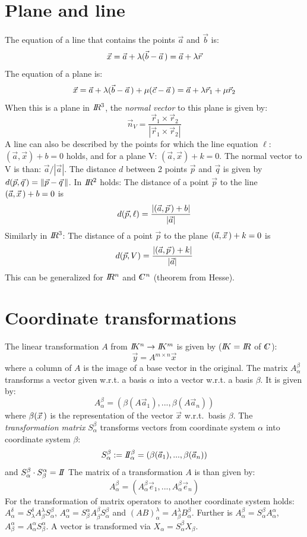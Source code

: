 \documentclass[twoside]{report}
\begin{document}
\section{Plane and line}
The equation of a line that contains the points $\vec{a}$ and $\vec{b}$ is:
\[
\vec{x}=\vec{a}+\lambda(\vec{b}-\vec{a}\,)=\vec{a}+\lambda\vec{r}
\]
The equation of a plane is:
\[
\vec{x}=\vec{a}+\lambda(\vec{b}-\vec{a}\,)+\mu(\vec{c}-\vec{a}\,)=\vec{a}+\lambda\vec{r}_1+\mu\vec{r}_2
\]
When this is a plane in $I\hspace{-1mm}R^3$, the {\it normal vector} to this plane is given
by:
\[
\vec{n}_V=\frac{\vec{r}_1\times\vec{r}_2}{|\vec{r}_1\times\vec{r}_2|}
\]
A line can also be described by the points for which the line equation
$\ell$: $(\vec{a},\vec{x})+b=0$ holds, and for a plane V: $(\vec{a},\vec{x})+k=0$.
The normal vector to V is than: $\vec{a}/|\vec{a}|$.
\npar
The distance $d$ between 2 points $\vec{p}$ and $\vec{q}$ is given by
$d(\vec{p},\vec{q}\,)=\|\vec{p}-\vec{q}\,\|$.
\npar
In $I\hspace{-1mm}R^2$ holds:
The distance of a point $\vec{p}$ to the line $(\vec{a},\vec{x}\,)+b=0$ is
\[
d(\vec{p},\ell)=\frac{|(\vec{a},\vec{p}\,)+b|}{|\vec{a}|}
\]
Similarly in $I\hspace{-1mm}R^3$:
The distance of a point $\vec{p}$ to the plane $(\vec{a},\vec{x}\,)+k=0$ is
\[
d(\vec{p},V)=\frac{|(\vec{a},\vec{p}\,)+k|}{|\vec{a}|}
\]
This can be generalized for $I\hspace{-1mm}R^n$ and $\CC^n$ (theorem from Hesse).

\section{Coordinate transformations}
The linear transformation $A$ from $I\hspace{-1mm}K^n\rightarrow I\hspace{-1mm}K^m$ is given by
($I\hspace{-1mm}K=I\hspace{-1mm}R$ of $\CC$):
\[
\vec{y}=A^{m\times n}\vec{x}
\]
where a column of $A$ is the image of a base vector in the original.
\npar
The matrix $A_\alpha^\beta$ transforms a vector given w.r.t. a basis
$\alpha$ into a vector w.r.t. a basis $\beta$. It is given by:
\[
A_\alpha^\beta=\left(\beta(A\vec{a}_1),...,\beta(A\vec{a}_n)\right)
\]
where $\beta(\vec{x}\,)$ is the representation of the vector $\vec{x}$
w.r.t.\ basis $\beta$.
\npar
The {\it transformation matrix} $S_\alpha^\beta$ transforms vectors from
coordinate system $\alpha$ into coordinate system $\beta$:
\[
S_\alpha^\beta:=I\hspace{-1mm}I_\alpha^\beta=\left(\beta(\vec{a}_1),...,\beta(\vec{a}_n)\right)
\]
and $S_\alpha^\beta\cdot S_\beta^\alpha=I\hspace{-1mm}I$
\npar
The matrix of a transformation $A$ is than given by:
\[
A_\alpha^\beta=\left(A_\alpha^\beta\vec{e}_1,...,A_\alpha^\beta\vec{e}_n\right)
\]
For the transformation of matrix operators to another coordinate system holds:
$A_\alpha^\delta=S_\lambda^\delta A_\beta^\lambda S_\alpha^\beta$,
$A_\alpha^\alpha=S_\beta^\alpha A_\beta^\beta S_\alpha^\beta$ and
$(AB)_\alpha^\lambda=A_\beta^\lambda B_\alpha^\beta$.
\npar
Further is $A_\alpha^\beta=S_\alpha^\beta A_\alpha^\alpha$,
$A_\beta^\alpha=A_\alpha^\alpha S_\beta^\alpha$. A vector is transformed via
$X_\alpha=S_\alpha^\beta X_\beta$.
\end{document}
